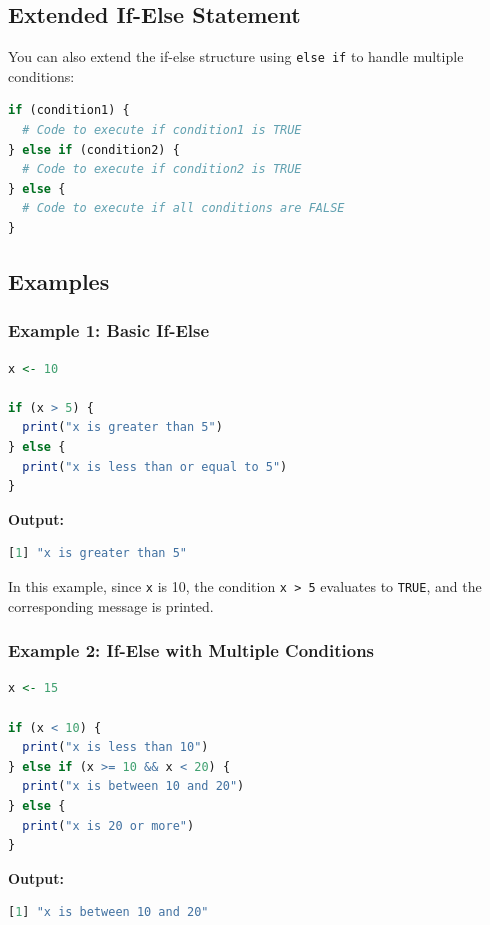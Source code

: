 \documentclass[10pt]{book}
\begin{document}
\subsection{Extended If-Else Statement}

You can also extend the if-else structure using \texttt{else if} to handle multiple conditions:

\begin{lstlisting}[language=R]
if (condition1) {
  # Code to execute if condition1 is TRUE
} else if (condition2) {
  # Code to execute if condition2 is TRUE
} else {
  # Code to execute if all conditions are FALSE
}
\end{lstlisting}

\subsection{Examples}

\subsubsection{Example 1: Basic If-Else}

\begin{lstlisting}[language=R]
x <- 10

if (x > 5) {
  print("x is greater than 5")
} else {
  print("x is less than or equal to 5")
}
\end{lstlisting}

\textbf{Output:}
\begin{lstlisting}[language=R]
[1] "x is greater than 5"
\end{lstlisting}

In this example, since \texttt{x} is 10, the condition \texttt{x > 5} evaluates to \texttt{TRUE}, and the corresponding message is printed.

\subsubsection{Example 2: If-Else with Multiple Conditions}

\begin{lstlisting}[language=R]
x <- 15

if (x < 10) {
  print("x is less than 10")
} else if (x >= 10 && x < 20) {
  print("x is between 10 and 20")
} else {
  print("x is 20 or more")
}
\end{lstlisting}

\textbf{Output:}
\begin{lstlisting}[language=R]
[1] "x is between 10 and 20"
\end{lstlisting}
\end{document}
